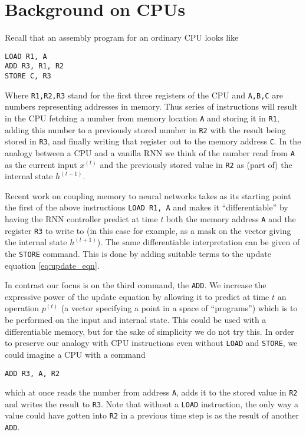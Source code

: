 \documentclass[english,letter paper,12pt,leqno]{article}
\theoremstyle{example}
\numberwithin{equation}{section}
\begin{document}
\newpage

\appendix

\section{Background on CPUs}\label{section:appendix_cpu}

Recall that an assembly program for an ordinary CPU looks like
\begin{verbatim}
LOAD R1, A
ADD R3, R1, R2
STORE C, R3
\end{verbatim}
Where \verb+R1,R2,R3+ stand for the first three registers of the CPU and \verb+A,B,C+ are numbers representing addresses in memory. Thus series of instructions will result in the CPU fetching a number from memory location \verb+A+ and storing it in \verb+R1+, adding this number to a previously stored number in \verb+R2+ with the result being stored in \verb+R3+, and finally writing that register out to the memory address \verb+C+. In the analogy between a CPU and a vanilla RNN we think of the number read from \verb+A+ as the current input $x^{(t)}$ and the previously stored value in \verb+R2+ as (part of) the internal state $h^{(t-1)}$.

Recent work \cite{??,??} on coupling memory to neural networks takes as its starting point the first of the above instructions \verb+LOAD R1, A+ and makes it ``differentiable'' by having the RNN controller predict at time $t$ both the memory address \verb+A+ and the register \verb+R3+ to write to (in this case for example, as a mask on the vector giving the internal state $h^{(t+1)}$). The same differentiable interpretation can be given of the \verb+STORE+ command. This is done by adding suitable terms to the update equation \eqref{eq:update_eqn}.

In contrast our focus is on the third command, the \verb+ADD+. We increase the expressive power of the update equation by allowing it to predict at time $t$ an operation $p^{(t)}$ (a vector specifying a point in a space of ``programs'') which is to be performed on the input and internal state. This could be used with a differentiable memory, but for the sake of simplicity we do not try this. In order to preserve our analogy with CPU instructions even without \verb+LOAD+ and \verb+STORE+, we could imagine a CPU with a command
\begin{verbatim}
ADD R3, A, R2
\end{verbatim}
which at once reads the number from address \verb+A+, adds it to the stored value in \verb+R2+ and writes the result to \verb+R3+. Note that without a \verb+LOAD+ instruction, the only way a value could have gotten into \verb+R2+ in a previous time step is as the result of another \verb+ADD+.
\end{document}
